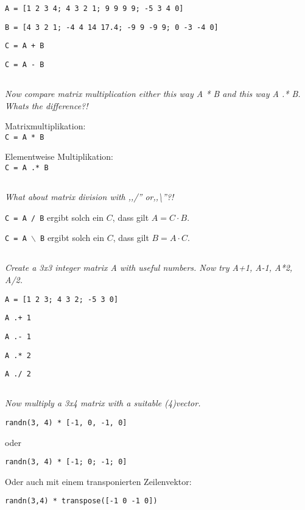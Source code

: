 \documentclass[11pt,a4paper]{article}
\begin{document}
\texttt{A = [1 2 3 4; 4 3 2 1; 9 9 9 9; -5 3 4 0]}

\texttt{B = [4 3 2 1; -4 4 14 17.4; -9 9 -9 9; 0 -3 -4 0]}

\texttt{C = A + B}

\texttt{C = A - B}

\subsection{}
\textit{Now compare matrix multiplication either this way A * B and this way A .* B. Whats the difference?!}

Matrixmultiplikation:\\
\texttt{C = A * B}

Elementweise Multiplikation:\\
\texttt{C = A .* B}

\subsection{}
\textit{What about matrix division with ,,/'' or,,\textbackslash''?!}

\texttt{C = A / B} ergibt solch ein $C$, dass gilt $A = C \cdot B$.

\texttt{C = A $\backslash$ B} ergibt solch ein $C$, dass gilt $B = A \cdot C$.


\subsection{}
\textit{Create a 3x3 integer matrix A with useful numbers. Now try A+1, A-1, A*2, A/2.}

\texttt{A = [1 2 3; 4 3 2; -5 3 0]}

\texttt{A .+ 1}

\texttt{A .- 1}

\texttt{A .* 2}

\texttt{A ./ 2}

\subsection{}
\textit{Now multiply a 3x4 matrix with a suitable (4)vector. }

\texttt{randn(3, 4) * [-1, 0, -1, 0]}

oder

\texttt{randn(3, 4) * [-1; 0; -1; 0]}

Oder auch mit einem transponierten Zeilenvektor:

\texttt{randn(3,4) * transpose([-1 0 -1 0])}
\end{document}
